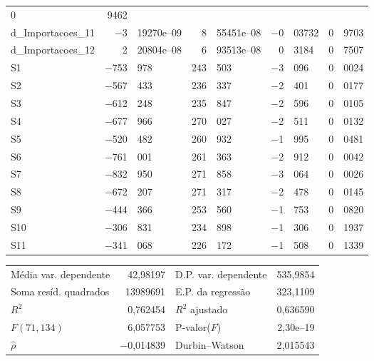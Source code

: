 \documentclass[11pt]{article}
\begin{document}
\begin{center}
\begin{tabular}{lr@{,}lr@{,}lr@{,}lr@{,}l}
        0&9462 \\
d\_Importacoes\_11 &
  $-$3&19270\textrm{e--09} &
    8&55451\textrm{e--08} &
      $-$0&03732 &
        0&9703 \\
d\_Importacoes\_12 &
  2&20804\textrm{e--08} &
    6&93513\textrm{e--08} &
      0&3184 &
        0&7507 \\
S1 &
  $-$753&978 &
    243&503 &
      $-$3&096 &
        0&0024 \\
S2 &
  $-$567&433 &
    236&337 &
      $-$2&401 &
        0&0177 \\
S3 &
  $-$612&248 &
    235&847 &
      $-$2&596 &
        0&0105 \\
S4 &
  $-$677&966 &
    270&027 &
      $-$2&511 &
        0&0132 \\
S5 &
  $-$520&482 &
    260&932 &
      $-$1&995 &
        0&0481 \\
S6 &
  $-$761&001 &
    261&363 &
      $-$2&912 &
        0&0042 \\
S7 &
  $-$832&950 &
    271&858 &
      $-$3&064 &
        0&0026 \\
S8 &
  $-$672&207 &
    271&317 &
      $-$2&478 &
        0&0145 \\
S9 &
  $-$444&366 &
    253&560 &
      $-$1&753 &
        0&0820 \\
S10 &
  $-$306&831 &
    234&898 &
      $-$1&306 &
        0&1937 \\
S11 &
  $-$341&068 &
    226&172 &
      $-$1&508 &
        0&1339 \\
\end{tabular}

\vspace{1ex}
\begin{tabular}{lrlr}
Média var. dependente &  42,98197 & D.P. var. dependente &  535,9854 \\
Soma resíd. quadrados &  13989691 & E.P. da regressão &  323,1109 \\
$R^2$ &  0,762454 & $R^2$ ajustado &  0,636590 \\
$F(71, 134)$ &  6,057753 & P-valor($F$) &  2,30\textrm{e--19} \\
$\hat{\rho}$ & $-$0,014839 & Durbin--Watson &  2,015543 \\
\end{tabular}


\end{center}
\end{document}

